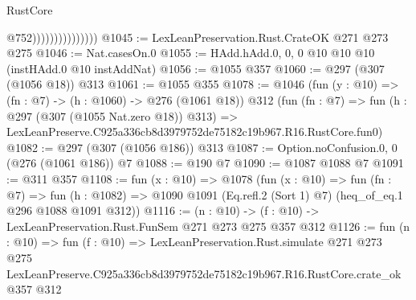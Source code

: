 \begin{lexlean}{RustCore}
\begin{coremodule}
                                  @752)))))))))))))))
@1045 := LexLeanPreservation.Rust.CrateOK @271 @273 @275
@1046 := Nat.casesOn.{0}
@1055 := HAdd.hAdd.{0, 0, 0} @10 @10 @10 (instHAdd.{0} @10 instAddNat)
@1056 := @1055 @357
@1060 := @297 (@307 (@1056 @18)) @313
@1061 := @1055 @355
@1078 := @1046
    (fun (y : @10) => (fn : @7) -> (h : @1060) -> @276 (@1061 @18))
    @312
    (fun (fn : @7) =>
    fun (h : @297 (@307 (@1055 Nat.zero @18)) @313) =>
    LexLeanPreserve.C925a336cb8d3979752de75182c19b967.R16.RustCore.fun0)
@1082 := @297 (@307 (@1056 @186)) @313
@1087 := Option.noConfusion.{0, 0} (@276 (@1061 @186)) @7
@1088 := @190 @7
@1090 := @1087 @1088 @7
@1091 := @311 @357
@1108 := fun (x : @10) =>
  @1078
    (fun (x : @10) =>
    fun (fn : @7) =>
    fun (h : @1082) => @1090 @1091 (Eq.refl.{2} (Sort 1) @7) (heq_of_eq.{1} @296 @1088 @1091 @312))
@1116 := (n : @10) -> (f : @10) -> LexLeanPreservation.Rust.FunSem @271 @273 @275 @357 @312
@1126 := fun (n : @10) =>
  fun (f : @10) =>
  LexLeanPreservation.Rust.simulate
    @271
    @273
    @275
    LexLeanPreserve.C925a336cb8d3979752de75182c19b967.R16.RustCore.crate_ok
    @357
    @312
\end{coremodule}
\end{lexlean}
